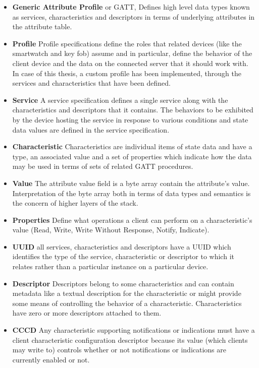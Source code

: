 \begin{itemize}
	\item \textbf{Generic Attribute Profile} or \ac{GATT}, Defines high level data types known as services, characteristics and descriptors in terms of underlying attributes in the attribute table.
	\item \textbf{Profile} Profile specifications define the roles that related devices (like the smartwatch and key fob) assume and in particular, define the behavior of the client device and the data on the connected server that it should work with. In case of this thesis, a custom profile has been implemented, through the services and characteristics that have been defined.
	\item \textbf{Service} A service specification defines a single service along with the characteristics and descriptors that it contains. The behaviors to be exhibited by the device hosting the service in response to various conditions and state data values are defined in the service specification.
	\item \textbf{Characteristic} Characteristics are individual items of state data and have a type, an associated value and a set of properties which indicate how the data may be used in terms of sets of related GATT procedures.
	\item \textbf{Value} The attribute value field is a byte array contain the attribute’s value. Interpretation of the byte array both in terms of data types and semantics is the concern of higher layers of the stack.
	\item \textbf{Properties} Define what operations a client can perform on a characteristic's value (Read, Write, Write Without Response, Notify, Indicate). 
	\item \textbf{UUID} all services, characteristics and descriptors have a \ac{UUID} which identifies the type of the service, characteristic or descriptor to which it relates rather than a particular instance on a particular device.
	\item \textbf{Descriptor} Descriptors belong to some characteristics and can contain metadata like a textual description for the characteristic or might provide some means of controlling the behavior of a characteristic. Characteristics have zero or more descriptors attached to them.
	\item \textbf{CCCD} Any characteristic supporting notifications or indications must have a client characteristic configuration descriptor because its value (which clients may write to) controls whether or not notifications or indications are currently enabled or not.
\end{itemize}
